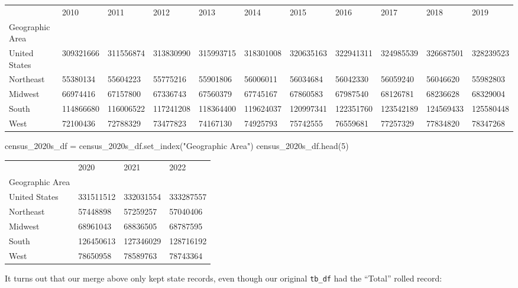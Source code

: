 \documentclass[
  letterpaper,
  DIV=11,
  numbers=noendperiod]{scrreprt}
\newenvironment{Shaded}{\begin{snugshade}}{\end{snugshade}}
\newcommand{\DecValTok}[1]{\textcolor[rgb]{0.68,0.00,0.00}{#1}}
\newcommand{\NormalTok}[1]{\textcolor[rgb]{0.00,0.23,0.31}{#1}}
\newcommand{\OperatorTok}[1]{\textcolor[rgb]{0.37,0.37,0.37}{#1}}
\newcommand{\StringTok}[1]{\textcolor[rgb]{0.13,0.47,0.30}{#1}}
\begin{document}
\begin{longtable}[]{@{}lllllllllll@{}}
\toprule\noalign{}
& 2010 & 2011 & 2012 & 2013 & 2014 & 2015 & 2016 & 2017 & 2018 & 2019 \\
Geographic Area & & & & & & & & & & \\
\midrule\noalign{}
\endhead
\bottomrule\noalign{}
\endlastfoot
United States & 309321666 & 311556874 & 313830990 & 315993715 &
318301008 & 320635163 & 322941311 & 324985539 & 326687501 & 328239523 \\
Northeast & 55380134 & 55604223 & 55775216 & 55901806 & 56006011 &
56034684 & 56042330 & 56059240 & 56046620 & 55982803 \\
Midwest & 66974416 & 67157800 & 67336743 & 67560379 & 67745167 &
67860583 & 67987540 & 68126781 & 68236628 & 68329004 \\
South & 114866680 & 116006522 & 117241208 & 118364400 & 119624037 &
120997341 & 122351760 & 123542189 & 124569433 & 125580448 \\
West & 72100436 & 72788329 & 73477823 & 74167130 & 74925793 & 75742555 &
76559681 & 77257329 & 77834820 & 78347268 \\
\end{longtable}

\begin{Shaded}
\begin{Highlighting}[]
\NormalTok{census\_2020s\_df }\OperatorTok{=}\NormalTok{ census\_2020s\_df.set\_index(}\StringTok{"Geographic Area"}\NormalTok{)}
\NormalTok{census\_2020s\_df.head(}\DecValTok{5}\NormalTok{)}
\end{Highlighting}
\end{Shaded}

\begin{longtable}[]{@{}llll@{}}
\toprule\noalign{}
& 2020 & 2021 & 2022 \\
Geographic Area & & & \\
\midrule\noalign{}
\endhead
\bottomrule\noalign{}
\endlastfoot
United States & 331511512 & 332031554 & 333287557 \\
Northeast & 57448898 & 57259257 & 57040406 \\
Midwest & 68961043 & 68836505 & 68787595 \\
South & 126450613 & 127346029 & 128716192 \\
West & 78650958 & 78589763 & 78743364 \\
\end{longtable}

It turns out that our merge above only kept state records, even though
our original \texttt{tb\_df} had the ``Total'' rolled record:
\end{document}
